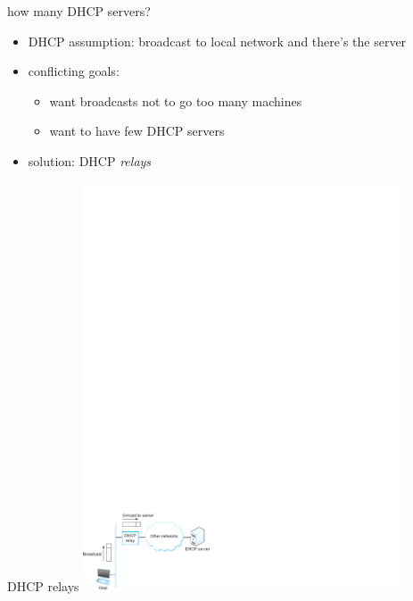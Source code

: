 \begin{frame}{how many DHCP servers?}
    \begin{itemize}
    \item DHCP assumption: broadcast to local network and there's the server
    \vspace{.5cm}
    \item conflicting goals:
        \begin{itemize}
        \item want broadcasts not to go too many machines
        \item want to have few DHCP servers
        \end{itemize}
    \item<2-> solution: DHCP \textit{relays}
    \end{itemize}
\end{frame}

\begin{frame}{DHCP relays}
\includegraphics[width=0.7\textwidth]{sysapproach-fig80}
\end{frame}
